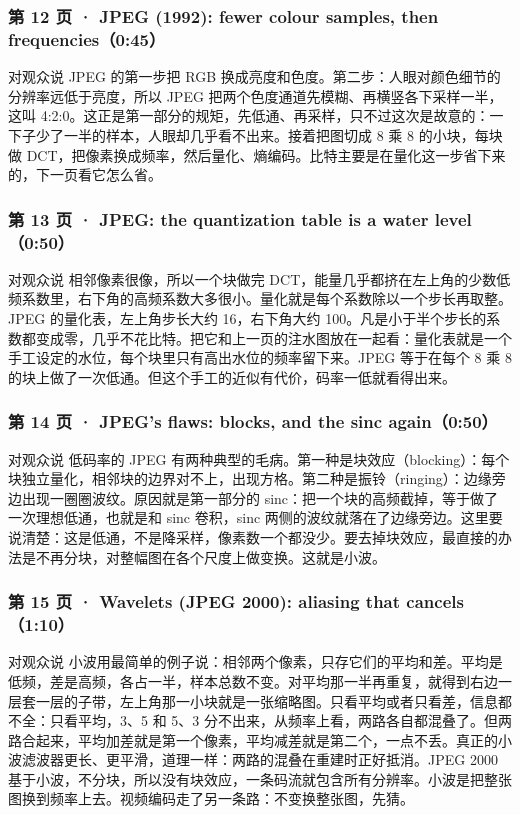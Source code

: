 \subsubsection*{第 12 页 · JPEG (1992): fewer colour samples, then frequencies（0:45）}
\begin{exampleblock}{对观众说}
JPEG 的第一步把 RGB 换成亮度和色度。第二步：人眼对颜色细节的分辨率远低于亮度，所以 JPEG 把两个色度通道先模糊、再横竖各下采样一半，这叫 4:2:0。这正是第一部分的规矩，先低通、再采样，只不过这次是故意的：一下子少了一半的样本，人眼却几乎看不出来。接着把图切成 8 乘 8 的小块，每块做 DCT，把像素换成频率，然后量化、熵编码。比特主要是在量化这一步省下来的，下一页看它怎么省。
\end{exampleblock}

\subsubsection*{第 13 页 · JPEG: the quantization table is a water level（0:50）}
\begin{exampleblock}{对观众说}
相邻像素很像，所以一个块做完 DCT，能量几乎都挤在左上角的少数低频系数里，右下角的高频系数大多很小。量化就是每个系数除以一个步长再取整。JPEG 的量化表，左上角步长大约 16，右下角大约 100。凡是小于半个步长的系数都变成零，几乎不花比特。把它和上一页的注水图放在一起看：量化表就是一个手工设定的水位，每个块里只有高出水位的频率留下来。JPEG 等于在每个 8 乘 8 的块上做了一次低通。但这个手工的近似有代价，码率一低就看得出来。
\end{exampleblock}

\subsubsection*{第 14 页 · JPEG's flaws: blocks, and the sinc again（0:50）}
\begin{exampleblock}{对观众说}
低码率的 JPEG 有两种典型的毛病。第一种是块效应（blocking）：每个块独立量化，相邻块的边界对不上，出现方格。第二种是振铃（ringing）：边缘旁边出现一圈圈波纹。原因就是第一部分的 sinc：把一个块的高频截掉，等于做了一次理想低通，也就是和 sinc 卷积，sinc 两侧的波纹就落在了边缘旁边。这里要说清楚：这是低通，不是降采样，像素数一个都没少。要去掉块效应，最直接的办法是不再分块，对整幅图在各个尺度上做变换。这就是小波。
\end{exampleblock}

\subsubsection*{第 15 页 · Wavelets (JPEG 2000): aliasing that cancels（1:10）}
\begin{exampleblock}{对观众说}
小波用最简单的例子说：相邻两个像素，只存它们的平均和差。平均是低频，差是高频，各占一半，样本总数不变。对平均那一半再重复，就得到右边一层套一层的子带，左上角那一小块就是一张缩略图。只看平均或者只看差，信息都不全：只看平均，3、5 和 5、3 分不出来，从频率上看，两路各自都混叠了。但两路合起来，平均加差就是第一个像素，平均减差就是第二个，一点不丢。真正的小波滤波器更长、更平滑，道理一样：两路的混叠在重建时正好抵消。JPEG 2000 基于小波，不分块，所以没有块效应，一条码流就包含所有分辨率。小波是把整张图换到频率上去。视频编码走了另一条路：不变换整张图，先猜。
\end{exampleblock}

